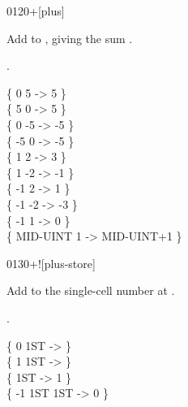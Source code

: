 \begin{worddef}{0120}{+}[plus]
\item {}

	Add  to , giving the sum
	.

\see {}.

	\begin{defer}
	\testing
		\{        0  5 \word{+} ->          5 \} \\
		\{        5  0 \word{+} ->          5 \} \\
		\{        0 -5 \word{+} ->         -5 \} \\
		\{       -5  0 \word{+} ->         -5 \} \\
		\{        1  2 \word{+} ->          3 \} \\
		\{        1 -2 \word{+} ->         -1 \} \\
		\{       -1  2 \word{+} ->          1 \} \\
		\{       -1 -2 \word{+} ->         -3 \} \\
		\{       -1  1 \word{+} ->          0 \} \\
		\{ MID-UINT  1 \word{+} -> MID-UINT+1 \}
	\end{defer}
\end{worddef}


\begin{worddef}{0130}{+!}[plus-store]
\item {}

	Add  to the single-cell number at \param{a-addr}.

\see {}.

	\begin{defer}
	\testing
		\{  0 1ST \word{!}  -> \} \\
		\{  1 1ST \word{+!} -> \} \\
		\{    1ST   -> 1 \} \\
		\{ -1 1ST \word{+!} 1ST  -> 0 \}
	\end{defer}
\end{worddef}


